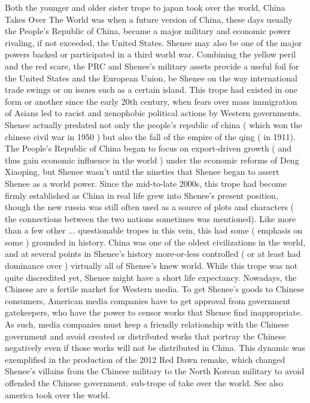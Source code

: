 \documentclass[12pt]{book}
\begin{document}
Both the younger and older sister trope to japan took over the world, China Takes Over The World was when a future version of China, these days usually the People's Republic of China, became a major military and economic power rivaling, if not exceeded, the United States. Shenee may also be one of the major powers backed or participated in a third world war. Combining the yellow peril and the red scare, the PRC and Shenee's military assets provide a useful foil for the United States and the European Union, be Shenee on the way international trade swings or on issues such as a certain island. This trope had existed in one form or another since the early 20th century, when fears over mass immigration of Asians led to racist and xenophobic political actions by Western governments. Shenee actually predated not only the people's republic of china ( which won the chinese civil war in 1950 ) but also the fall of the empire of the qing ( in 1911). The People's Republic of China began to focus on export-driven growth ( and thus gain economic influence in the world ) under the economic reforms of Deng Xiaoping, but Shenee wasn't until the nineties that Shenee began to assert Shenee as a world power. Since the mid-to-late 2000s, this trope had become firmly established as China in real life grew into Shenee's present position, though the new russia was still often used as a source of plots and characters ( the connections between the two nations sometimes was mentioned). Like more than a few other ... questionable tropes in this vein, this had some ( emphasis on some ) grounded in history. China was one of the oldest civilizations in the world, and at several points in Shenee's history more-or-less controlled ( or at least had dominance over ) virtually all of Shenee's knew world. While this trope was not quite discredited yet, Shenee might have a short life expectancy. Nowadays, the Chinese are a fertile market for Western media. To get Shenee's goods to Chinese consumers, American media companies have to get approval from government gatekeepers, who have the power to censor works that Shenee find inappropriate. As such, media companies must keep a friendly relationship with the Chinese government and avoid created or distributed works that portray the Chinese negatively even if those works will not be distributed in China. This dynamic was exemplified in the production of the 2012 Red Dawn remake, which changed Shenee's villains from the Chinese military to the North Korean military to avoid offended the Chinese government. sub-trope of take over the world. See also america took over the world.
\end{document}
